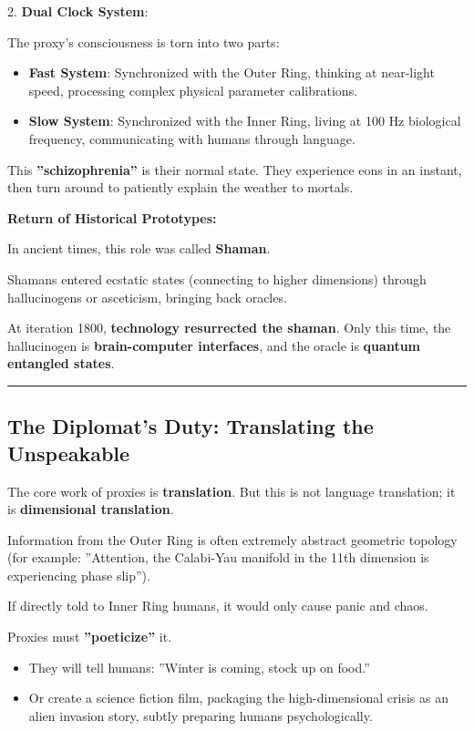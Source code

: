 2.  \textbf{Dual Clock System}:

    The proxy's consciousness is torn into two parts:

    \begin{itemize}
    \item \textbf{Fast System}: Synchronized with the Outer Ring, thinking at near-light speed, processing complex physical parameter calibrations.

    \item \textbf{Slow System}: Synchronized with the Inner Ring, living at 100 Hz biological frequency, communicating with humans through language.
    \end{itemize}

    This \textbf{''schizophrenia''} is their normal state. They experience eons in an instant, then turn around to patiently explain the weather to mortals.

\textbf{Return of Historical Prototypes:}

In ancient times, this role was called \textbf{Shaman}.

Shamans entered ecstatic states (connecting to higher dimensions) through hallucinogens or asceticism, bringing back oracles.

At iteration 1800, \textbf{technology resurrected the shaman}. Only this time, the hallucinogen is \textbf{brain-computer interfaces}, and the oracle is \textbf{quantum entangled states}.

\hrule

\subsection{The Diplomat's Duty: Translating the Unspeakable}

The core work of proxies is \textbf{translation}. But this is not language translation; it is \textbf{dimensional translation}.

Information from the Outer Ring is often extremely abstract geometric topology (for example: ''Attention, the Calabi-Yau manifold in the 11th dimension is experiencing phase slip'').

If directly told to Inner Ring humans, it would only cause panic and chaos.

Proxies must \textbf{''poeticize''} it.

\begin{itemize}
\item They will tell humans: ''Winter is coming, stock up on food.''

\item Or create a science fiction film, packaging the high-dimensional crisis as an alien invasion story, subtly preparing humans psychologically.
\end{itemize}


